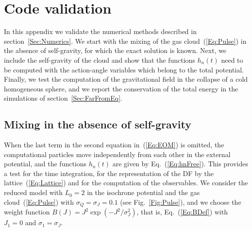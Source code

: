 \section{Code validation}
\label{Sec:Validation}

In this appendix we validate the numerical methods described in section~\ref{Sec:Numerics}. We start with the mixing of the gas cloud~(\ref{Eq:Pulse}) in the absence of self-gravity, for which the exact solution is known. Next, we include the self-gravity of the cloud and show that the functions $h_n(t)$ need to be computed with the action-angle variables which belong to the total potential. Finally, we test the computation of the gravitational field in the collapse of a cold homogeneous sphere, and we report the conservation of the total energy in the simulations of section~\ref{Sec:FarFromEq}.


\subsection{Mixing in the absence of self-gravity}
\label{SubSec:ValFree}

When the last term in the second equation in~(\ref{Eq:EOM}) is omitted, the computational particles move independently from each other in the external potential, and the functions $h_n(t)$ are given by Eq.~(\ref{Eq:hnFree}). This provides a test for the time integration, for the representation of the DF by the lattice~(\ref{Eq:Lattice}) and for the computation of the observables. We consider the reduced model with $L_0 = 2$ in the isochrone potential and the gas cloud~(\ref{Eq:Pulse}) with $\sigma_Q = \sigma_J = 0.1$ (see Fig.~\ref{Fig:Pulse}), and we choose the weight function $B(J) = J^2\exp(-J^2/\sigma_J^2)$, that is, Eq.~(\ref{Eq:BDef}) with $J_1 = 0$ and $\sigma_1 = \sigma_J$.

